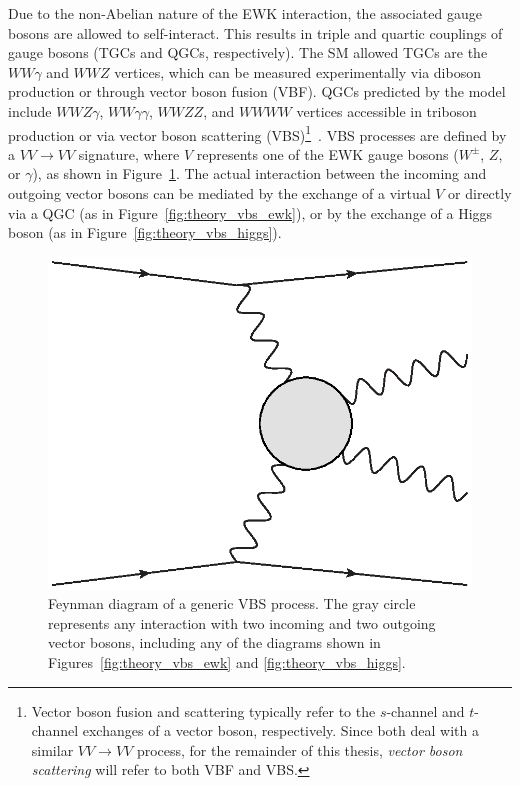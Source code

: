 
Due to the non-Abelian nature of the EWK interaction, the associated gauge bosons are allowed to self-interact.
This results in triple and quartic couplings of gauge bosons (TGCs and QGCs, respectively).
The SM allowed TGCs are the $WW\gamma$ and $WWZ$ vertices, which can be measured experimentally via diboson production or through vector boson fusion (VBF).
QGCs predicted by the model include $WWZ\gamma$, $WW\gamma\gamma$, $WWZZ$, and $WWWW$ vertices accessible in triboson production or via vector boson scattering (VBS)\footnote{Vector boson fusion and scattering typically refer to the $s$-channel and $t$-channel exchanges of a vector boson, respectively.  Since both deal with a similar $VV\rightarrow VV$ process, for the remainder of this thesis, \emph{vector boson scattering} will refer to both VBF and VBS.}~\cite{2017.multiboson-at-lhc}.
VBS processes are defined by a $VV\rightarrow VV$ signature, where $V$ represents one of the EWK gauge bosons ($W^{\pm}$, $Z$, or $\gamma$), as shown in Figure~\ref{fig:theory_generic_vbs}.
The actual interaction between the incoming and outgoing vector bosons can be mediated by the exchange of a virtual $V$ or directly via a QGC (as in Figure~\ref{fig:theory_vbs_ewk}), or by the exchange of a Higgs boson (as in Figure~\ref{fig:theory_vbs_higgs}).

\begin{figure}[htbp]
  \centering
  \includegraphics[width=.4\textwidth]{figs/theory/generic_vbs}
  \caption{Feynman diagram of a generic VBS process.  The gray circle represents any interaction with two incoming and two outgoing vector bosons, including any of the diagrams shown in Figures~\ref{fig:theory_vbs_ewk} and \ref{fig:theory_vbs_higgs}.}
  \label{fig:theory_generic_vbs}
\end{figure}

